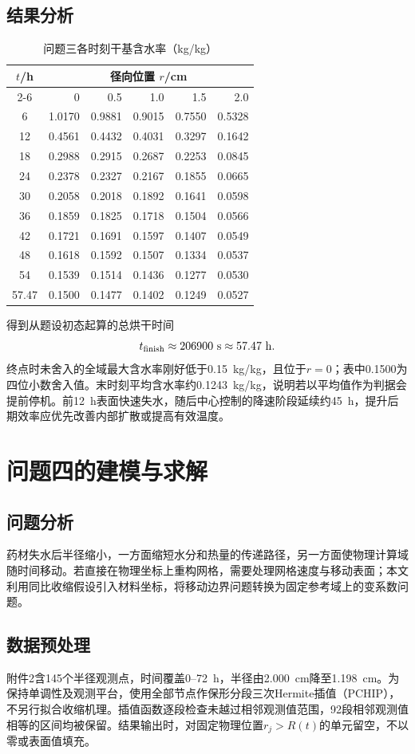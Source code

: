 \documentclass[UTF8,a4paper,zihao=-4,fontset=fandol]{ctexart}
\begin{document}
\subsection{结果分析}
\begin{table}[htbp]
\centering\small
\caption{问题三各时刻干基含水率（kg/kg）}\label{tab:q3c}
\begin{tabular}{crrrrr}
\toprule
$t$/h&\multicolumn{5}{c}{径向位置 $r$/cm}\\\cmidrule(lr){2-6}
&0&0.5&1.0&1.5&2.0\\\midrule
6&1.0170&0.9881&0.9015&0.7550&0.5328\\
12&0.4561&0.4432&0.4031&0.3297&0.1642\\
18&0.2988&0.2915&0.2687&0.2253&0.0845\\
24&0.2378&0.2327&0.2167&0.1855&0.0665\\
30&0.2058&0.2018&0.1892&0.1641&0.0598\\
36&0.1859&0.1825&0.1718&0.1504&0.0566\\
42&0.1721&0.1691&0.1597&0.1407&0.0549\\
48&0.1618&0.1592&0.1507&0.1334&0.0537\\
54&0.1539&0.1514&0.1436&0.1277&0.0530\\
57.47&0.1500&0.1477&0.1402&0.1249&0.0527\\\bottomrule
\end{tabular}
\end{table}
得到从题设初态起算的总烘干时间
\[
t_{\rm finish}\approx206900~{\rm s}\approx57.47~{\rm h}.
\]
终点时未舍入的全域最大含水率刚好低于0.15~kg/kg，且位于$r=0$；表中0.1500为四位小数舍入值。末时刻平均含水率约0.1243~kg/kg，说明若以平均值作为判据会提前停机。前12~h表面快速失水，随后中心控制的降速阶段延续约45~h，提升后期效率应优先改善内部扩散或提高有效温度。

\section{问题四的建模与求解}
\label{sec:problem4}
\subsection{问题分析}
药材失水后半径缩小，一方面缩短水分和热量的传递路径，另一方面使物理计算域随时间移动。若直接在物理坐标上重构网格，需要处理网格速度与移动表面；本文利用同比收缩假设引入材料坐标，将移动边界问题转换为固定参考域上的变系数问题。
\subsection{数据预处理}
附件2含145个半径观测点，时间覆盖0--72~h，半径由2.000~cm降至1.198~cm。为保持单调性及观测平台，使用全部节点作保形分段三次Hermite插值（PCHIP）\cite{fritsch1980}，不另行拟合收缩机理。插值函数逐段检查未越过相邻观测值范围，92段相邻观测值相等的区间均被保留。结果输出时，对固定物理位置$r_j>R(t)$的单元留空，不以零或表面值填充。
\end{document}
